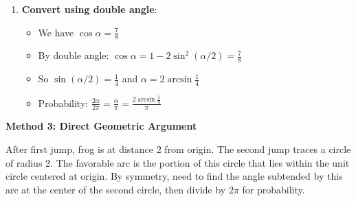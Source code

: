 \documentclass[12pt]{article}
\begin{document}
\begin{solutionbox}
\begin{enumerate}
    \item \textbf{Convert using double angle}:
    \begin{itemize}
        \item We have $\cos\alpha = \frac{7}{8}$
        \item By double angle: $\cos\alpha = 1 - 2\sin^2(\alpha/2) = \frac{7}{8}$
        \item So $\sin(\alpha/2) = \frac{1}{4}$ and $\alpha = 2\arcsin\frac{1}{4}$
        \item Probability: $\frac{2\alpha}{2\pi} = \frac{\alpha}{\pi} = \frac{2\arcsin\frac{1}{4}}{\pi}$
    \end{itemize}
\end{enumerate}

\textbf{Method 3: Direct Geometric Argument}

After first jump, frog is at distance 2 from origin. The second jump traces a circle of radius 2. The favorable arc is the portion of this circle that lies within the unit circle centered at origin. By symmetry, need to find the angle subtended by this arc at the center of the second circle, then divide by $2\pi$ for probability.

\end{solutionbox}
\end{document}
